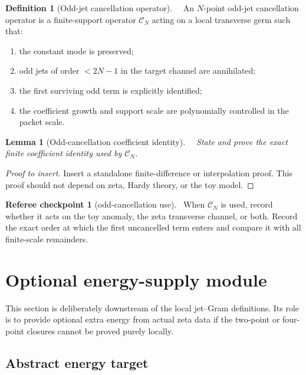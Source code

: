 \documentclass[11pt,a4paper]{amsart}
\newcommand{\Status}[1]{\textnormal{\fbox{\scriptsize\textsf{#1}}}}
\newcommand{\Core}{\Status{CORE}}
\newcommand{\Open}{\Status{OPEN}}
\theoremstyle{plain}
\newtheorem{lemma}[theorem]{Lemma}
\theoremstyle{definition}
\newtheorem{definition}[theorem]{Definition}
\newtheorem{checkpoint}[theorem]{Referee checkpoint}
\begin{document}
\begin{definition}[Odd-jet cancellation operator]
\label{def:odd-jet-cancellation-operator}
\Core\ \Open\
An \(N\)-point odd-jet cancellation operator is a finite-support operator \(\mathcal C_N\) acting on a local transverse germ such that:
\begin{enumerate}[label=\textup{C\arabic*.},leftmargin=*]
\item the constant mode is preserved;
\item odd jets of order \(<2N-1\) in the target channel are annihilated;
\item the first surviving odd term is explicitly identified;
\item the coefficient growth and support scale are polynomially controlled in the packet scale.
\end{enumerate}
\end{definition}

\begin{lemma}[Odd-cancellation coefficient identity]
\label{lem:odd-cancellation-coefficient-identity}
\Core\ \Open\
State and prove the exact finite coefficient identity used by \(\mathcal C_N\).
\end{lemma}

\begin{proof}[Proof to insert]
Insert a standalone finite-difference or interpolation proof.  This proof should not depend on zeta, Hardy theory, or the toy model.
\end{proof}

\begin{checkpoint}[odd-cancellation use]
\label{chk:odd-cancellation-use}
\Core\
When \(\mathcal C_N\) is used, record whether it acts on the toy anomaly, the zeta transverse channel, or both.  Record the exact order at which the first uncancelled term enters and compare it with all finite-scale remainders.
\end{checkpoint}

\section{Optional energy-supply module}
\label{sec:energy-supply-module}

This section is deliberately downstream of the local jet--Gram definitions.  Its role is to provide optional extra energy from actual zeta data if the two-point or four-point closures cannot be proved purely locally.

\subsection{Abstract energy target}
\label{subsec:abstract-energy-target}
\end{document}
